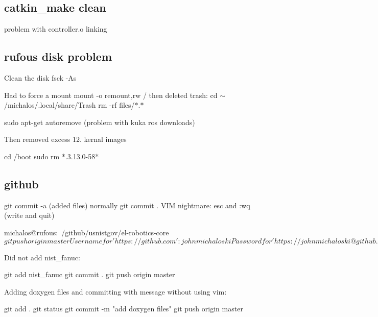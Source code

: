 \subsection*{catkin\-\_\-make clean }

problem with controller.\-o linking

\subsection*{rufous disk problem }

Clean the disk fsck -\/\-As

Had to force a mount mount -\/o remount,rw / then deleted trash\-: cd $\sim$/michalos/.local/share/\-Trash rm -\/rf files/$\ast$.$\ast$

sudo apt-\/get autoremove (problem with kuka ros downloads)

Then removed excess 12. kernal images \begin{DoxyVerb}cd /boot
sudo rm *.3.13.0-58*
\end{DoxyVerb}


\subsection*{github }

git commit -\/a (added files) normally git commit . V\-I\-M nightmare\-: esc and \-:wq (write and quit)

\begin{DoxyVerb}michalos@rufous:~/github/usnistgov/el-robotics-core$ git push origin master
Username for 'https://github.com': johnmichaloski
Password for 'https://johnmichaloski@github.com': 
Counting objects: 10, done.
Delta compression using up to 8 threads.
Compressing objects: 100%
Writing objects: 100%
Total 2 (delta 1), reused 0 (delta 0)
To https://github.com/usnistgov/el-robotics-core
   395d561..b74a274  master -> master
michalos@rufous:~/github/usnistgov/el-robotics-core$ 
\end{DoxyVerb}


Did not add nist\-\_\-fanuc\-: \begin{DoxyVerb}git add nist_fanuc
git commit .
git push origin master
\end{DoxyVerb}


Adding doxygen files and committing with message without using vim\-: \begin{DoxyVerb}git add .
git status
git commit -m "add doxygen files"
git push origin master
\end{DoxyVerb}


